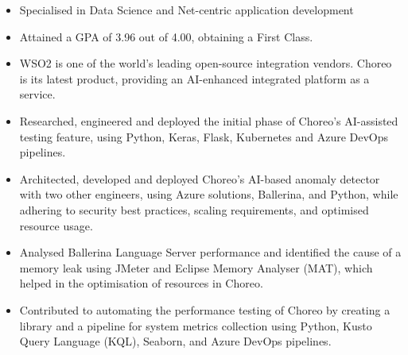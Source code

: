 \documentclass[12pt,a4paper,withhyper]{altacv}
\begin{document}
\divider{}

\begin{itemize}
    \item Specialised in Data Science and Net-centric application development
    \item Attained a GPA of 3.96 out of 4.00, obtaining a First Class.
\end{itemize}

\medskip


\begin{itemize}
    \item WSO2 is one of the world's leading open-source integration vendors. Choreo is its latest product, providing an AI-enhanced integrated platform as a service. 
    \item Researched, engineered and deployed the initial phase of Choreo's AI-assisted testing feature, using Python, Keras, Flask, Kubernetes and Azure DevOps pipelines.
    \item Architected, developed and deployed Choreo’s AI-based anomaly detector with two other engineers, using Azure solutions, Ballerina, and Python, while adhering to security best practices, scaling requirements, and optimised resource usage.
    \item Analysed Ballerina Language Server performance and identified the cause of a memory leak using JMeter and Eclipse Memory Analyser (MAT), which helped in the optimisation of resources in Choreo.
    \item Contributed to automating the performance testing of Choreo by creating a library and a pipeline for system metrics collection using Python, Kusto Query Language (KQL), Seaborn, and Azure DevOps pipelines.
\end{itemize}
\end{document}
